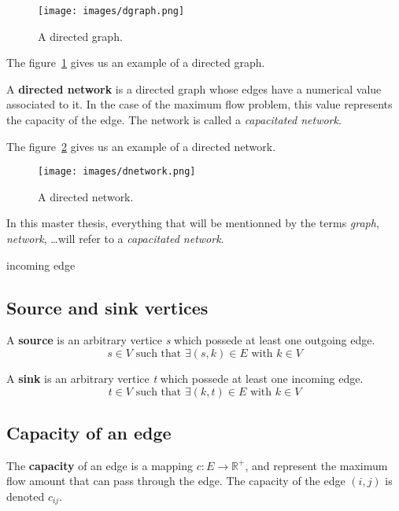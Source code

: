 \begin{figure}
\centering
\texttt{[image: images/dgraph.png]}
\caption{A directed graph.}
\label{img:dgraph}
\end{figure}

The figure~\ref{img:dgraph} gives us an example of a directed graph.

\begin{definition}
\label{dnetwork}
A \textbf{directed network} is a directed graph whose edges have a numerical value associated to it. In the case of the maximum flow problem, this value represents the capacity of the edge. The network is called a \textit{capacitated network}.
\end{definition}

The figure~\ref{img:dnetwork} gives us an example of a directed network. \\

\begin{figure}
\centering
\texttt{[image: images/dnetwork.png]}
\caption{A directed network.}
\label{img:dnetwork}
\end{figure}



In this master thesis, everything that will be mentionned by the terms \textit{graph}, \textit{network}, \dots will refer to a \textit{capacitated network}.

\begin{definition}
\label{iedge}
incoming edge %
\end{definition}


\subsection{Source and sink vertices}
\begin{definition}
\label{source}
A \textbf{source} is an arbitrary vertice \textit{s} which possede at least one outgoing edge.
$$s \in V \text{ such that } \exists (s, k) \in E \text{ with } k \in V$$
\end{definition}

\begin{definition}
\label{sink}
A \textbf{sink} is an arbitrary vertice \textit{t} which possede at least one incoming edge. 
$$t \in V \text{ such that } \exists (k, t) \in E \text{ with } k \in V$$
\end{definition}

\subsection{Capacity of an edge}
\begin{definition}
\label{cedge}
The \textbf{capacity} of an edge is a mapping $c: E \to \mathbb{R}^{+}$, and represent the maximum flow amount that can pass through the edge. The capacity of the edge $(i, j)$ is denoted $c_{ij}$.
\end{definition}


